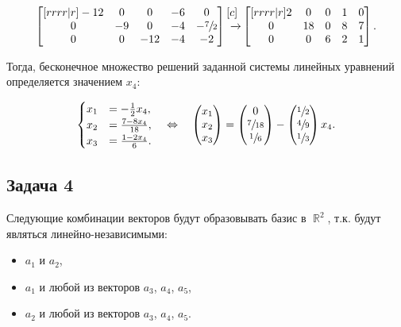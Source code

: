 \documentclass[a4paper,11pt]{article}
\DeclareMathOperator*{\R}{\mathbb{R}}   %
\begin{document}
\begin{align*}
\begin{bmatrix}[rrrr|r]
 -12 &   0 &   0 &  -6 &   0 \\
   0 &  -9 &   0 &  -4 &  -\sfrac{7}{2} \\
   0 &   0 & -12 &  -4 &  -2
\end{bmatrix}
\begin{matrix}[c] ~ \\ ~\xrightarrow{} \\ ~ \end{matrix}
\begin{bmatrix}[rrrr|r]
   2 &   0 &   0 &   1 &   0 \\
   0 &  18 &   0 &   8 &   7 \\
   0 &   0 &   6 &   2 &   1
\end{bmatrix}.
\end{align*}

Тогда, бесконечное множество решений заданной системы линейных уравнений определяется значением $x_4$:

\begin{align*}
\begin{cases}
  x_1 & = -\frac{1}{2}x_4, \\
  x_2 & = \frac{7-8x_4}{18}, \\
  x_3 & = \frac{1 - 2x_4}{6}.
\end{cases}
\quad \Leftrightarrow \quad
\begin{pmatrix}
  x_1 \\
  x_2 \\
  x_3
\end{pmatrix}
=
\begin{pmatrix}
  0 \\
  \sfrac{7}{18} \\
  \sfrac{1}{6}
\end{pmatrix}
-
\begin{pmatrix}
  \sfrac{1}{2} \\
  \sfrac{4}{9} \\
  \sfrac{1}{3}
\end{pmatrix}
x_4.
\end{align*}

\subsection{Задача 4}

Следующие комбинации векторов будут образовывать базис в $\R^2$, т.к. будут являться линейно-независимыми:

\begin{itemize}
  \item $a_1$ и $a_2$,
  \item $a_1$ и любой из векторов $a_3$, $a_4$, $a_5$,
  \item $a_2$ и любой из векторов $a_3$, $a_4$, $a_5$.    
\end{itemize}
\end{document}
